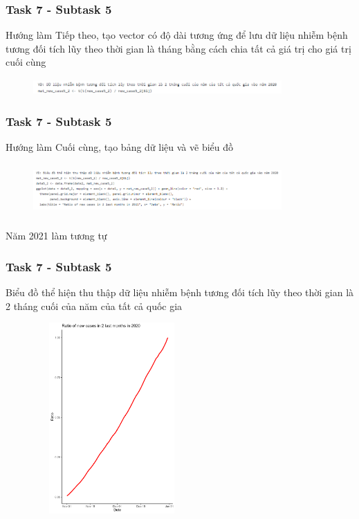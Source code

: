 \documentclass[english,10pt,table]{beamer}
\begin{document}
\frame
{
    \frametitle{Task 7 - Subtask 5}
    \begin{block}{Hướng làm}
    Tiếp theo, tạo vector có độ dài tương ứng để lưu dữ liệu nhiễm bệnh tương đối tích lũy theo thời gian là tháng bằng cách chia tất cả giá trị cho giá trị cuối cùng
	\begin{figure}[H]
		\centering
		\includegraphics[height=0.6cm,width=9.5cm]{images/7.0.7.png}
	\end{figure}
    \end{block}
}
\frame
{
    \frametitle{Task 7 - Subtask 5}
    \begin{block}{Hướng làm}
    Cuối cùng, tạo bảng dữ liệu và vẽ biểu đồ
	\begin{figure}[H]
		\centering
		\includegraphics[height=2cm,width=9.5cm]{images/7.0.8.png}
	\end{figure}
	Năm 2021 làm tương tự
    \end{block}
}
\frame
{
    \frametitle{Task 7 - Subtask 5}
    \begin{block}{Biểu đồ thể hiện thu thập dữ liệu nhiễm bệnh tương đối tích lũy theo thời gian là 2 tháng cuối của năm của tất cả quốc gia}
    \begin{figure}[H]
		\centering
		\includegraphics[height=7.3cm,width=6cm]{images/7.5.1.png}
	\end{figure}
    \end{block}
}
\frame
\end{document}
